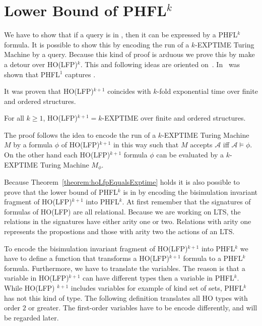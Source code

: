 

\section{Lower Bound of PHFL$^k$}\label{sec:lowerBoundOfPhfl}

We have to show that if a query is in , then it can be expressed by a PHFL$^k$ formula. It is
possible to show this by encoding the run of a $k$-EXPTIME Turing Machine by a query. Because this kind of proof is
arduous we prove this by make a detour over HO(LFP)$^k$. This and following ideas are oriented
on~\cite{lange2014capturing}. In~\cite{lange2014capturing} was shown that PHFL$^1$ captures .

It was proven that HO(LFP)$^{k + 1}$ coincides with $k$-fold exponential time over finite and ordered structures.

\begin{theorem}{\cite{freireMartins2011descriptive}}\label{theorem:hoLfpEqualsExptime}
    For all $k \geq 1$, HO(LFP)$^{k + 1} = k$-EXPTIME over finite and ordered structures.
\end{theorem}

The proof follows the idea to encode the run of a $k$-EXPTIME Turing Machine $M$ by a formula $\phi$ of HO(LFP)$^{k +
1}$ in this way such that $M$ accepts $\mathcal{A}$ iff $\mathcal{A} \models \phi$. On the other hand each HO(LFP)$^{k +
1}$ formula $\phi$ can be evaluated by a $k$-EXPTIME Turing Machine $M_\phi$.

Because Theorem~\ref{theorem:hoLfpEqualsExptime} holds it is also possible to prove that the lower bound of PHFL$^k$
is in  by encoding the bisimulation invariant fragment of HO(LFP)$^{k + 1}$ into PHFL$^k$. At first
remember that the signatures of formulas of HO(LFP) are all relational. Because we are working on LTS, the
relations in the signatures have either arity one or two. Relations with arity one represents the propostions and
those with arity two the actions of an LTS.

To encode the bisimulation invariant fragment of HO(LFP)$^{k + 1}$ into PHFL$^k$ we have to define a function that
transforms a HO(LFP)$^{k + 1}$ formula to a PHFL$^k$ formula. Furthermore, we have to translate the variables. The
reason is that a variable in HO(LFP)$^{k + 1}$ can have different types then a variable in PHFL$^k$. While HO(LFP)
$^{k + 1}$ includes variables for example of kind set of sets, PHFL$^k$ has not this kind of type. The following
definition translates all HO types with order $2$ or greater. The first-order variables have to be encode
differently, and will be regarded later.

